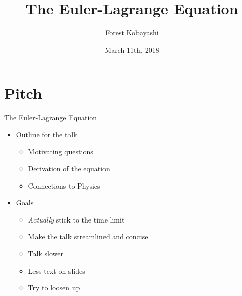 \documentclass{fkpresentation}
\title{\textmd{The Euler-Lagrange Equation}}
\author{Forest Kobayashi}
\institute{Harvey Mudd College}
\date{March 11th, 2018}
\begin{document}
\section{Pitch}
\begin{frame}{The Euler-Lagrange Equation}
  \begin{itemize}
    \item Outline for the talk
      \begin{itemize}
        \item Motivating questions
        \item Derivation of the equation
        \item Connections to Physics
      \end{itemize}
    \item Goals
      \begin{itemize}
        \item \emph{Actually} stick to the time limit
        \item Make the talk streamlined and concise
        \item Talk slower
        \item Less text on slides
        \item Try to loosen up
      \end{itemize}
  \end{itemize}
\end{frame}
\end{document}
